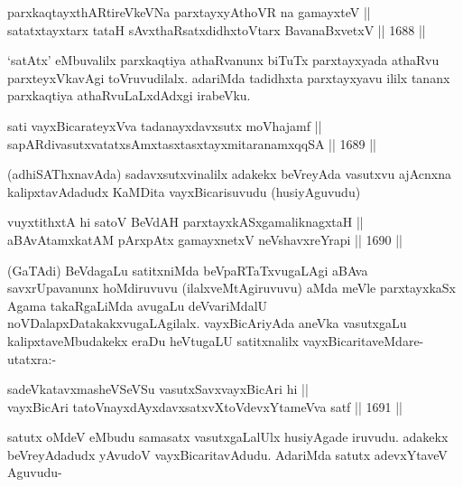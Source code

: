\begin{shl}
parxkaqtayxthARtireVkeVNa parxtayxyAthoVR na gamayxteV || \\
satatxtayxtarx tataH sAvxthaRsatxdidhxtoV\s tarx BavanaBxvetxV \hfill || 1688 ||  
\end{shl}

\begin{artha}
`satAtx' eMbuvalilx parxkaqtiya athaRvanunx biTuTx parxtayxyada athaRvu parxteyxVkavAgi toVruvudilalx. adariMda tadidhxta parxtayxyavu ililx tananx parxkaqtiya athaRvuLaLxdAdxgi irabeVku.
\end{artha}

\begin{shl}
sati vayxBicarateyxVva tadanayxdavxsutx moVhajamf || \\
sapARdivasutxvatatxsAmxtasxtasxtayxmitaranamxqqSA \hfill || 1689 ||  
\end{shl}

\begin{artha}
(adhiSAThxnavAda) sadavxsutxvinalilx adakekx beVreyAda vasutxvu ajAcnxna kalipxtavAdadudx KaMDita vayxBicarisuvudu (husiyAguvudu)
\end{artha}

\begin{shl}
vuyxtithxtA hi satoV BeVdAH parxtayxkASxgamaliknagxtaH ||  \\
aBAvAtamxkatAM pArxpAtx gamayxnetxV neVshavxreYrapi \hfill || 1690 ||  
\end{shl}

\begin{artha}
(GaTAdi) BeVdagaLu satitxniMda beVpaRTaTxvugaLAgi aBAva savxrUpavanunx hoMdiruvuvu (ilalxveMtAgiruvuvu) aMda meVle parxtayxkaSx Agama takaRgaLiMda avugaLu deVvariMdalU noVDalapxDatakakxvugaLAgilalx. vayxBicAriyAda aneVka vasutxgaLu kalipxtaveMbudakekx eraDu heVtugaLU satitxnalilx vayxBicaritaveMdare- utatxra:-
\end{artha}

\begin{shl}
sadeVkatavxmasheVSeVSu vasutxSavxvayxBicAri hi ||  \\
vayxBicAri tatoVnayxdAyxdavxsatxvXtoV\s devxYtameVva satf \hfill || 1691 ||  
\end{shl}

\begin{artha}
satutx oMdeV eMbudu samasatx vasutxgaLalUlx husiyAgade iruvudu. adakekx beVreyAdadudx yAvudoV vayxBicaritavAdudu. AdariMda satutx adevxYtaveV Aguvudu-
\end{artha}

